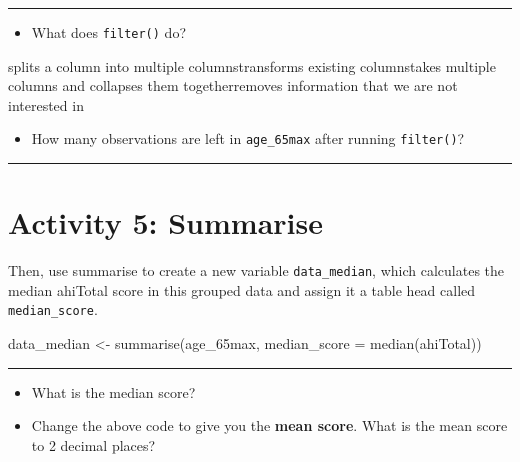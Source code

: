 \documentclass[
  oneside]{book}
\newenvironment{Shaded}{\begin{snugshade}}{\end{snugshade}}
\newcommand{\AttributeTok}[1]{\textcolor[rgb]{0.77,0.63,0.00}{#1}}
\newcommand{\FunctionTok}[1]{\textcolor[rgb]{0.00,0.00,0.00}{#1}}
\newcommand{\NormalTok}[1]{#1}
\newcommand{\OtherTok}[1]{\textcolor[rgb]{0.56,0.35,0.01}{#1}}
\providecommand{\tightlist}{%
  \setlength{\itemsep}{0pt}\setlength{\parskip}{0pt}}
\begin{document}
\begin{center}\rule{0.5\linewidth}{0.5pt}\end{center}

\begin{itemize}
\tightlist
\item
  What does \texttt{filter()} do?
\end{itemize}

splits a column into multiple columnstransforms existing columnstakes multiple columns and collapses them togetherremoves information that we are not interested in

\begin{itemize}
\tightlist
\item
  How many observations are left in \texttt{age\_65max} after running \texttt{filter()}?
\end{itemize}

\begin{center}\rule{0.5\linewidth}{0.5pt}\end{center}

\hypertarget{activity-5-summarise}{%
\section{Activity 5: Summarise}\label{activity-5-summarise}}

Then, use summarise to create a new variable \texttt{data\_median}, which calculates the median ahiTotal score in this grouped data and assign it a table head called \texttt{median\_score}.

\begin{Shaded}
\begin{Highlighting}[]
\NormalTok{data\_median }\OtherTok{\textless{}{-}} \FunctionTok{summarise}\NormalTok{(age\_65max, }\AttributeTok{median\_score =} \FunctionTok{median}\NormalTok{(ahiTotal))}
\end{Highlighting}
\end{Shaded}

\begin{center}\rule{0.5\linewidth}{0.5pt}\end{center}

\begin{itemize}
\item
  What is the median score?
\item
  Change the above code to give you the \textbf{mean score}. What is the mean score to 2 decimal places?
\end{itemize}
\end{document}
